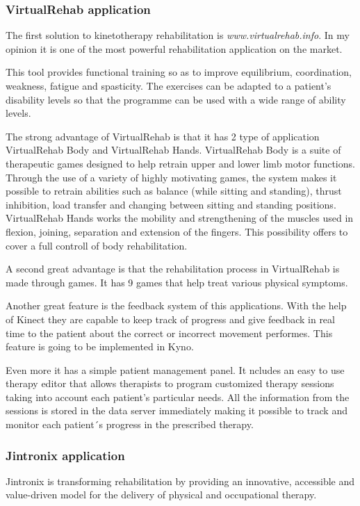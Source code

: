 \subsubsection{VirtualRehab application}
The first solution to kinetotherapy rehabilitation is \textit{www.virtualrehab.info}. In my opinion it is one of the most powerful rehabilitation application on the market. 

This tool provides functional training so as to improve equilibrium, coordination, weakness, fatigue and spasticity. The exercises can be adapted to a patient’s disability levels so that the programme can be used with a wide range of ability levels.

The strong advantage of VirtualRehab is that it has 2 type of application VirtualRehab Body and VirtualRehab Hands. 
VirtualRehab Body is a suite of therapeutic
games designed to help retrain upper and lower
limb motor functions.
Through the use of a variety of highly motivating
games, the system makes it possible to retrain
abilities such as balance (while sitting and
standing), thrust inhibition, load transfer
and changing between sitting and standing
positions. VirtualRehab Hands works the mobility and
strengthening of the muscles used in flexion,
joining, separation and extension of the fingers. This possibility offers to cover a full controll of body rehabilitation.

A second great advantage is that the rehabilitation process in VirtualRehab is made through games. It has 9 games that help treat various physical symptoms.

Another great feature is the feedback system of this applications. With the help of Kinect they are capable to keep track of progress and give feedback in real time to the patient about the correct or incorrect movement performes. This feature is going to be implemented in Kyno.

Even more it has a simple patient management panel. It ncludes an easy to use therapy editor that allows therapists to program customized therapy sessions taking into account each patient’s particular needs.  All the information from the sessions is stored in the data server immediately making it possible to track and monitor each patient´s progress in the prescribed therapy.
\subsubsection{Jintronix application}
Jintronix is transforming rehabilitation by providing an innovative, accessible and value-driven model for the delivery of physical and occupational therapy. 

